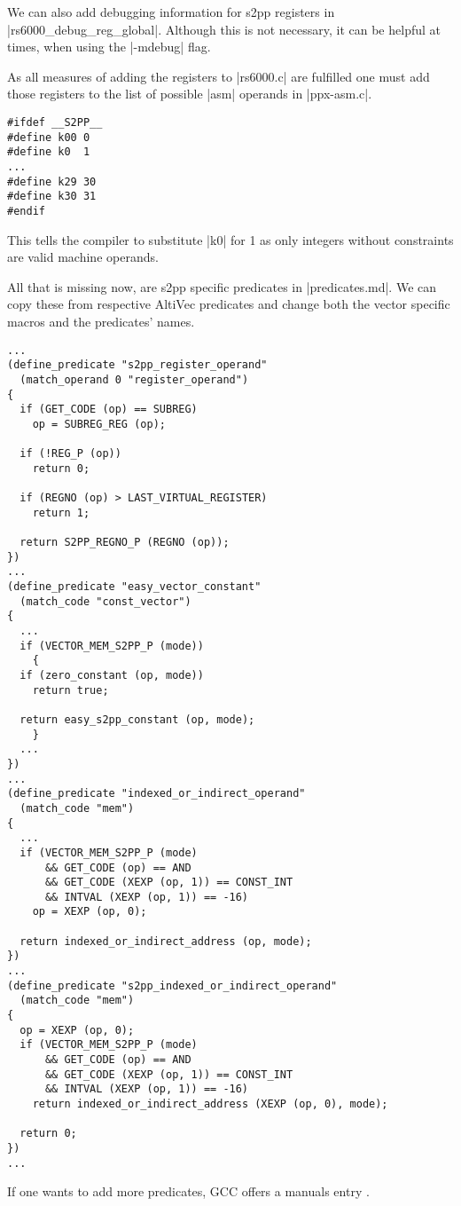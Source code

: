 We can also add debugging information for s2pp registers in |rs6000_debug_reg_global|.
Although this is not necessary, it can be helpful at times, when using the |-mdebug| flag.

As all measures of adding the registers to |rs6000.c| are fulfilled one must add those registers to the list of possible |asm| operands in |ppx-asm.c|.
\begin{lstlisting}
#ifdef __S2PP__
#define k00 0
#define k0  1
...
#define k29 30
#define k30 31
#endif
\end{lstlisting}
This tells the compiler to substitute |k0| for 1 as only integers without constraints are valid machine operands.

All that is missing now, are s2pp specific predicates in |predicates.md|.
We can copy these from respective AltiVec predicates and change both the vector specific macros and the predicates' names.
\begin{lstlisting}
...
(define_predicate "s2pp_register_operand"
  (match_operand 0 "register_operand")
{
  if (GET_CODE (op) == SUBREG)
    op = SUBREG_REG (op);

  if (!REG_P (op))
    return 0;

  if (REGNO (op) > LAST_VIRTUAL_REGISTER)
    return 1;

  return S2PP_REGNO_P (REGNO (op));
})
...
(define_predicate "easy_vector_constant"
  (match_code "const_vector")
{
  ...
  if (VECTOR_MEM_S2PP_P (mode))
    {
  if (zero_constant (op, mode))
    return true;

  return easy_s2pp_constant (op, mode);
    }
  ...
})
...
(define_predicate "indexed_or_indirect_operand"
  (match_code "mem")
{
  ...
  if (VECTOR_MEM_S2PP_P (mode)
      && GET_CODE (op) == AND
      && GET_CODE (XEXP (op, 1)) == CONST_INT
      && INTVAL (XEXP (op, 1)) == -16)
    op = XEXP (op, 0);

  return indexed_or_indirect_address (op, mode);
})
...
(define_predicate "s2pp_indexed_or_indirect_operand"
  (match_code "mem")
{
  op = XEXP (op, 0);
  if (VECTOR_MEM_S2PP_P (mode)
      && GET_CODE (op) == AND
      && GET_CODE (XEXP (op, 1)) == CONST_INT
      && INTVAL (XEXP (op, 1)) == -16)
    return indexed_or_indirect_address (XEXP (op, 0), mode);

  return 0;
})
...    
\end{lstlisting}
If one wants to add more predicates, GCC offers a manuals entry \citep{GCCint:predicates}.

